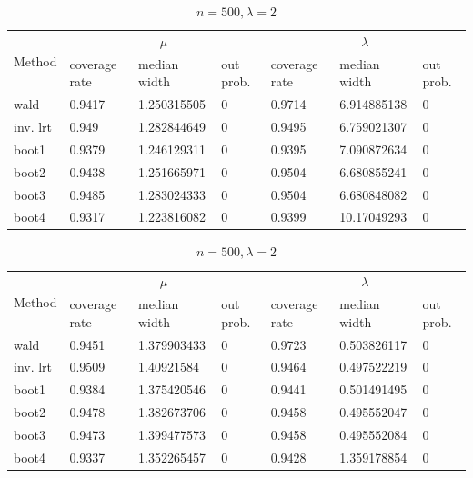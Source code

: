 \documentclass{article}
\begin{document}
       \begin{table}
       \ContinuedFloat
        \begin{subtable}[b]{\textwidth}
		\centering
		\begin{tabular}{l|lll|lll}
		\toprule
        \multirow{2}{*}{Method} & \multicolumn{3}{c|}{$\mu$}      & \multicolumn{3}{c}{$\lambda$}  \\ 
                           & coverage rate & median width & out prob. & coverage rate & median width & out prob. \\
                           \midrule
wald      & 0.9417	&1.250315505	&0 & 0.9714	&6.914885138	&0\\
inv. lrt  & 0.949	&1.282844649	&0 & 0.9495	&6.759021307	&0\\
boot1     & 0.9379	&1.246129311	&0 & 0.9395	&7.090872634	&0\\
boot2     & 0.9438	&1.251665971	&0 & 0.9504	&6.680855241	&0\\
boot3     & 0.9485	&1.283024333	&0 & 0.9504	&6.680848082	&0\\
boot4     & 0.9317	&1.223816082	&0 & 0.9399	&10.17049293	&0\\
       \bottomrule
       \end{tabular}
       \caption{$n = 100, \lambda = 12$}
       \label{100_12}
       \end{subtable}%

        \begin{subtable}[b]{\textwidth}
		\centering
		\begin{tabular}{l|lll|lll}
		\toprule
        \multirow{2}{*}{Method} & \multicolumn{3}{c|}{$\mu$}      & \multicolumn{3}{c}{$\lambda$}  \\ 
                           & coverage rate & median width & out prob. & coverage rate & median width & out prob. \\
                           \midrule
wald      & 0.9451	&1.379903433	 &0 & 0.9723	&0.503826117	&0 \\
inv. lrt  & 0.9509	&1.40921584	     &0 & 0.9464	&0.497522219	&0 \\
boot1     & 0.9384	&1.375420546	 &0 & 0.9441	&0.501491495	&0 \\
boot2     & 0.9478	&1.382673706	 &0 & 0.9458	&0.495552047	&0 \\
boot3     & 0.9473	&1.399477573	 &0 & 0.9458	&0.495552084	&0 \\
boot4     & 0.9337	&1.352265457	 &0 & 0.9428	&1.359178854	&0 \\
       \bottomrule
       \end{tabular}
       \caption{$n = 500, \lambda = 2$}
       \label{500_2}
       \end{subtable}%



\end{table}
\end{document}
